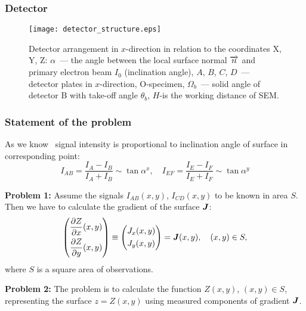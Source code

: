 \documentclass{beamer}
\begin{document}
\begin{frame}[c]
    \frametitle{Detector}
    \begin{figure}
        \texttt{[image: detector\_structure.eps]}
        \caption{Detector arrangement in $x$-direction in relation to the coordinates X, Y, Z:
        \@ $\alpha$~--- the angle between the local surface normal $\protect\overrightarrow{n}$
        and primary electron beam $I_0$ (inclination angle), $A$, $B$, $C$, $D$~--- detector
        plates in $x$-direction, O-specimen, $\Omega_{b}$~--- solid angle of detector B with
        take-off angle $\theta_b$, $H$-is the working distance of SEM.}
        {\label{fig:detector_structure}}%
    \end{figure}
\end{frame}

\begin{frame}[c,allowframebreaks]
    \frametitle{Statement of the problem}
    As we know~\cite{PaluszynskiSlowko2005Vacuum, DrzazgaPaluszynski2005Measurement} signal
    intensity is proportional to inclination angle of surface in corresponding point:
    $$ I_{AB} = \frac{I_A - I_B}{I_A + I_B} \sim \tan{\alpha^x}, \quad I_{EF} = \frac{I_E - I_F}{I_E + I_F} \sim \tan{\alpha^y} $$


    \textbf{Problem 1:} Assume the signals $I_{AB}(x,y)$, $I_{CD}(x,y)$ to be known in area $S$.
    Then we have to calculate the gradient of the surface ${\textbf{\emph{J}}}$:
    \begin{equation}
        \label{problem_statement}
        \left(
        \begin{aligned}
            &\frac{\partial Z}{\partial x} (x,y)\\
            &\frac{\partial Z}{\partial y} (x,y)
        \end{aligned}
        \right)
        \equiv
        \left(
        \begin{aligned}
            &J_x (x,y)\\
            &J_y (x,y)
        \end{aligned}
        \right)
        = {\textbf{\emph{J}}}(x,y)
        , \quad (x,y) \in S,
    \end{equation}
    where $S$ is a square area of observations.

    \vfill

    \textbf{Problem 2:}
    The problem is to calculate the function $Z(x,y)$, $(x,y) \in S$,
    representing the surface $z = Z(x,y)$ using measured components of gradient ${\textbf{\emph{J}}}$.

\end{frame}
\end{document}
